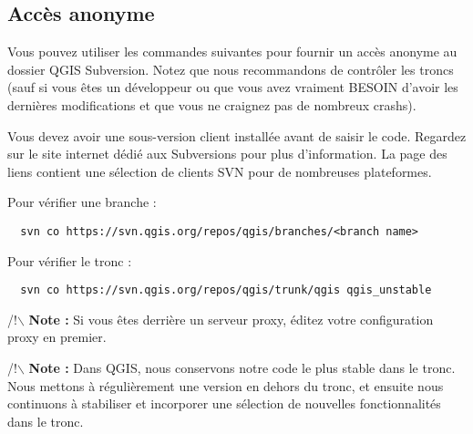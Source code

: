 \subsection{Accès anonyme}

Vous pouvez utiliser les commandes suivantes pour fournir un accès anonyme au dossier QGIS Subversion. Notez que nous recommandons de contrôler les troncs (sauf si vous êtes un développeur ou que vous avez vraiment BESOIN d'avoir les dernières modifications et que vous ne craignez pas de nombreux crashs).

Vous devez avoir une sous-version client installée avant de saisir le code. Regardez sur le site internet dédié aux Subversions pour plus d'information. La page des liens contient une sélection de clients SVN pour de nombreuses plateformes.

Pour vérifier une branche :

\begin{verbatim}
  svn co https://svn.qgis.org/repos/qgis/branches/<branch name>
\end{verbatim}

Pour vérifier le tronc :

\begin{verbatim}
  svn co https://svn.qgis.org/repos/qgis/trunk/qgis qgis_unstable
\end{verbatim}

/!$\backslash$ \textbf{Note :} Si vous êtes derrière un serveur proxy, éditez votre configuration proxy en premier.

/!$\backslash$ \textbf{Note :} Dans QGIS, nous conservons notre code le plus stable dans le tronc. Nous mettons à régulièrement une version en dehors du tronc, et ensuite nous continuons à stabiliser et incorporer une sélection de nouvelles fonctionnalités  dans le tronc.

